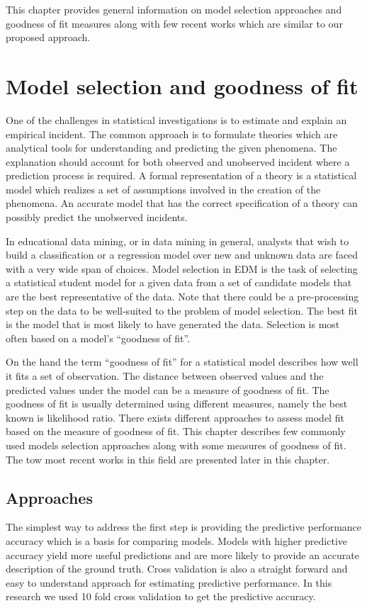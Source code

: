 \label{sec:RelatedWorks}

This chapter provides general information on model selection approaches and goodness of fit measures along with few recent works which are similar to our proposed approach. 

\section{Model selection and goodness of fit}
One of the challenges in statistical investigations is to estimate and explain an empirical incident. The common approach is to formulate theories which are analytical tools for understanding and predicting the given phenomena. The explanation should account for both observed and unobserved incident where a prediction process is required. A formal representation of a theory is a statistical model which realizes a set of assumptions involved in the creation of the phenomena. An accurate model that has the correct specification of a theory can possibly predict the unobserved incidents.

In educational data mining, or in data mining in general, analysts that wish to build a classification or a regression model over new and unknown data are faced with a very wide span of choices. Model selection in EDM is the task of selecting a statistical student model for a given data from a set of candidate models that are the best representative of the data. Note that there could be a pre-processing step on the data to be well-suited to the problem of model selection. The best fit is the model that is most likely to have generated the data. Selection is most often based on a model's ``goodness of fit''.

On the hand the term ``goodness of fit''  for a statistical model describes how well it fits a set of observation. The distance between observed values and the predicted values under the model can be a measure of goodness of fit. The goodness of fit is usually determined using different measures, namely the best known is likelihood ratio. There exists different approaches to assess model fit based on the measure of goodness of fit. This chapter describes few commonly used models selection approaches along with some measures of goodness of fit. The tow most recent works \citep{Desmarais2010,Rosenberg2015} in this field are presented later in this chapter.

\subsection{Approaches}
The simplest way to address the first step is providing the predictive performance accuracy which is a basis for comparing models. Models with higher predictive accuracy yield more useful predictions and are more likely to provide an accurate description of the ground truth. Cross validation is also a straight forward and easy to understand approach for estimating predictive performance. In this research we used 10 fold cross validation to get the predictive accuracy.

